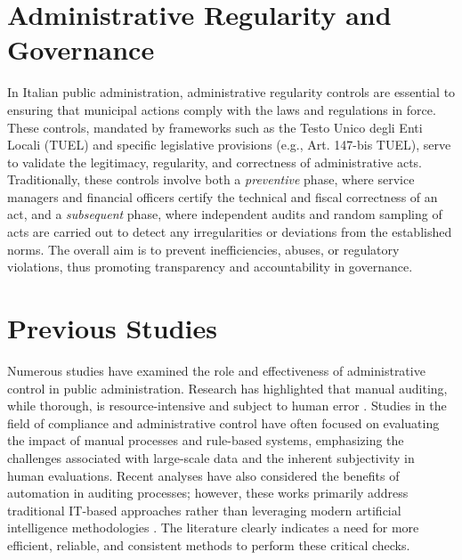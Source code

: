 \documentclass[../main.tex]{subfiles}
\begin{document}

\section*{Administrative Regularity and Governance}
In Italian public administration, administrative regularity controls are essential to ensuring that municipal actions comply with the laws and regulations in force. These controls, mandated by frameworks such as the Testo Unico degli Enti Locali (TUEL) and specific legislative provisions (e.g., Art. 147-bis TUEL), serve to validate the legitimacy, regularity, and correctness of administrative acts. Traditionally, these controls involve both a \textit{preventive} phase, where service managers and financial officers certify the technical and fiscal correctness of an act, and a \textit{subsequent} phase, where independent audits and random sampling of acts are carried out to detect any irregularities or deviations from the established norms. The overall aim is to prevent inefficiencies, abuses, or regulatory violations, thus promoting transparency and accountability in governance.



\section*{Previous Studies}
Numerous studies have examined the role and effectiveness of administrative control in public administration. Research has highlighted that manual auditing, while thorough, is resource-intensive and subject to human error . Studies in the field of compliance and administrative control have often focused on evaluating the impact of manual processes and rule-based systems, emphasizing the challenges associated with large-scale data and the inherent subjectivity in human evaluations. Recent analyses have also considered the benefits of automation in auditing processes; however, these works primarily address traditional IT-based approaches rather than leveraging modern artificial intelligence methodologies . The literature clearly indicates a need for more efficient, reliable, and consistent methods to perform these critical checks.
\end{document}
